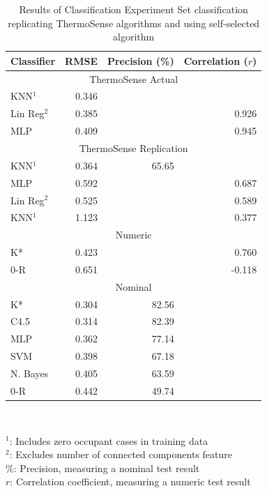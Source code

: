 \documentclass[../thesis/thesis.tex]{subfiles}
\begin{document}
\begin{table}
\centering
\begin{tabular}{|l|r|r|r|}
\hline
\textbf{Classifier} & \textbf{RMSE} & \textbf{Precision (\%)} & \textbf{Correlation ($r$)} \\ \hline
\multicolumn{4}{|c|}{\cellcolor{black!15} ThermoSense Actual}                         \\ \hline
KNN$^1$             & 0.346         &             &              \\ \hline
Lin Reg$^2$         & 0.385         &             & 0.926        \\ \hline
MLP                 & 0.409         &             & 0.945        \\ \hline
\multicolumn{4}{|c|}{\cellcolor{black!15} ThermoSense Replication}                    \\ \hline
KNN$^1$             & 0.364         & 65.65       &              \\ \hline
MLP                 & 0.592         &             & 0.687        \\ \hline
Lin Reg$^2$         & 0.525         &             & 0.589        \\ \hline
KNN$^1$             & 1.123         &             & 0.377        \\ \hline
\multicolumn{4}{|c|}{\cellcolor{black!15} Numeric}                                    \\ \hline
K*                  & 0.423         &             & 0.760        \\ \hline
0-R                 & 0.651         &             & -0.118       \\ \hline
\multicolumn{4}{|c|}{\cellcolor{black!15} Nominal}                                    \\ \hline
K*                  & 0.304         & 82.56       &              \\ \hline
C4.5                & 0.314         & 82.39       &              \\ \hline
MLP                 & 0.362         & 77.14       &              \\ \hline
SVM                 & 0.398         & 67.18       &              \\ \hline
N. Bayes            & 0.405         & 63.59       &              \\ \hline
0-R                 & 0.442         & 49.74       &              \\ \hline
\end{tabular}\\
\parbox{300pt}{
$^1$: Includes zero occupant cases in training data \\
$^2$: Excludes number of connected components feature \\
\%: Precision, measuring a nominal test result \\
$r$: Correlation coefficient, measuring a numeric test result \\
}
\caption{Results of Classification Experiment Set classification replicating ThermoSense algorithms and using self-selected algorithm}
\label{tab:results:set1}
\end{table}
\end{document}
